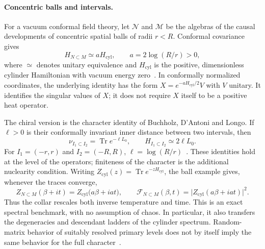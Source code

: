 \documentclass[a4paper,11pt]{article}
\theoremstyle{definition}
\begin{document}
\paragraph{Concentric balls and intervals.}
For a vacuum conformal field theory, let $\mathcal N$ and $\mathcal M$ be the algebras of the causal developments of concentric spatial balls of radii $r<R$. Conformal covariance gives
\begin{equation}
 H_{N\subset M}\simeq aH_{\mathrm{cyl}},
 \qquad a=2\log(R/r)>0,
 \label{eq:inclusion-cylinder}
\end{equation}
where $\simeq$ denotes unitary equivalence and $H_{\mathrm{cyl}}$ is the positive, dimensionless cylinder Hamiltonian with vacuum energy zero~\cite{companionQFT}. In conformally normalized coordinates, the underlying identity has the form $X=e^{-aH_{\mathrm{cyl}}/2}V$ with $V$ unitary. It identifies the singular values of $X$; it does not require $X$ itself to be a positive heat operator.

The chiral version is the character identity of Buchholz, D'Antoni and Longo. If $\ell>0$ is their conformally invariant inner distance between two intervals, then
\begin{equation}
 \nu_{I_1\subset I_2}=\operatorname{Tr}e^{-\ell L_0},
 \qquad H_{I_1\subset I_2}\simeq2\ell L_0.
 \label{eq:BDL-character}
\end{equation}
For $I_1=(-r,r)$ and $I_2=(-R,R)$, $\ell=\log(R/r)$~\cite{BDL2007}. These identities hold at the level of the operators; finiteness of the character is the additional nuclearity condition. Writing $Z_{\mathrm{cyl}}(z)=\operatorname{Tr}e^{-zH_{\mathrm{cyl}}}$, the ball example gives, whenever the traces converge,
\begin{equation}
 Z_{N\subset M}(\beta+it)=Z_{\mathrm{cyl}}\bigl(a\beta+iat\bigr),
 \qquad
 \mathcal F_{N\subset M}(\beta,t)
   =\bigl|Z_{\mathrm{cyl}}(a\beta+iat)\bigr|^2.
 \label{eq:inclusion-cylinder-SFF}
\end{equation}
Thus the collar rescales both inverse temperature and time. This is an exact spectral benchmark, with no assumption of chaos. In particular, it also transfers the degeneracies and descendant ladders of the cylinder spectrum. Random-matrix behavior of suitably resolved primary levels does not by itself imply the same behavior for the full character~\cite{HaehlMarteauReevesRozali2023}.
\end{document}
